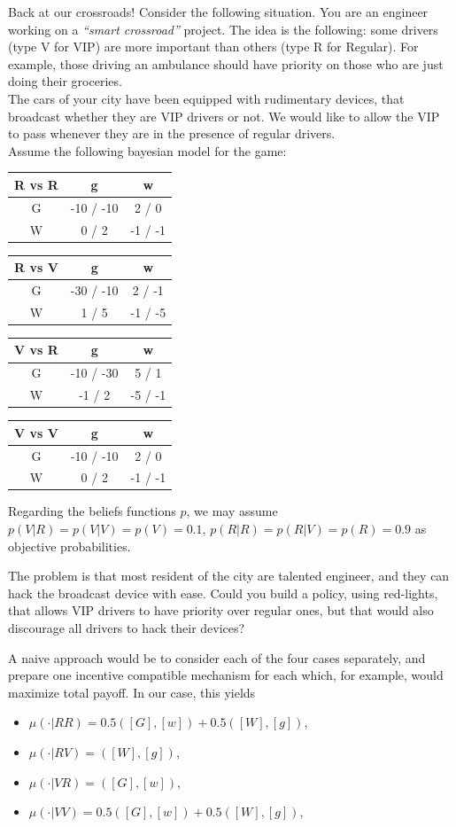 \begin{example}
Back at our crossroads!
Consider the following situation. You are an engineer working on a \emph{``smart crossroad''} project. 
The idea is the following: some drivers (type V for VIP) are more important than others (type R for Regular). For example, those driving an ambulance should have priority on those who are just doing their groceries.\\
The cars of your city have been equipped with rudimentary devices, that broadcast whether they are VIP drivers or not. We would like to allow the VIP to pass whenever they are in the presence of regular drivers. \\
Assume the following bayesian model for the game:
\begin{center}
\begin{tabular}{c | c  c}
R vs R & g & w\\
\hline
G & -10 / -10 & 2 / 0  \\
W & 0 / 2 & -1 / -1 
\end{tabular}
\begin{tabular}{c | c  c}
R vs V & g & w\\
\hline 
G & -30 / -10 & 2 / -1  \\
W & 1 / 5 & -1 / -5 
\end{tabular}
\begin{tabular}{c | c  c}
V vs R & g & w\\
\hline 
G & -10 / -30 & 5 / 1  \\
W & -1 / 2 & -5 / -1 
\end{tabular}
\begin{tabular}{c | c  c}
V vs V & g & w\\
\hline 
G & -10 / -10 & 2 / 0  \\
W & 0 / 2 & -1 / -1 
\end{tabular}
\end{center}
Regarding the beliefs functions $p$, we may assume $p(V | R) = p(V | V) =  p(V) = 0.1$, $p(R | R) = p(R | V) = p(R) = 0.9$ as objective probabilities.

The problem is that most resident of the city are talented engineer, and they can hack the broadcast device with ease.
Could you build a policy, using red-lights, that allows VIP drivers to have priority over regular ones, but that would also discourage all drivers to hack their devices?



A naive approach would be to consider each of the four cases separately, and prepare one incentive compatible mechanism for each which, for example, would maximize total payoff.
In our case, this yields
\begin{itemize}
\item $\mu(\cdot | RR) = 0.5([G], [w]) + 0.5([W], [g])$,
\item $\mu(\cdot | RV) = ([W], [g])$,
\item $\mu(\cdot | VR) = ([G], [w])$,
\item $\mu(\cdot | VV) = 0.5([G], [w]) + 0.5([W], [g])$,
\end{itemize}


\end{example}
